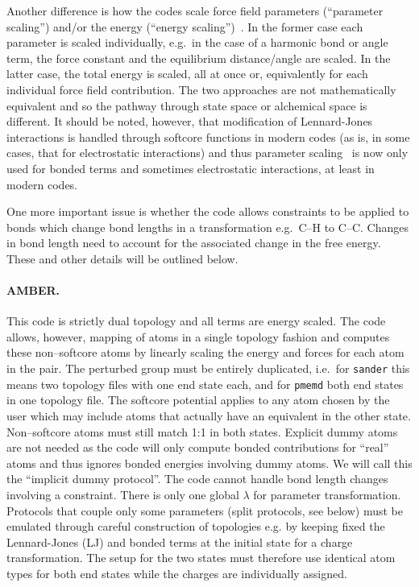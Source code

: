 \documentclass[journal=jctcce,manuscript=article]{achemso}
\newcommand{\progname}[1]{\texttt{#1}}
\begin{document}
Another difference is how the codes scale force field parameters (``parameter 
scaling'') and/or the energy (``energy 
scaling'')~\cite{doi:10.1021/jp981628n}.  In the former case each parameter is 
scaled individually, e.g.\ in the case of a harmonic bond or angle term,
the force constant and the equilibrium distance/angle are scaled. In the 
latter case, the total energy is scaled, all at once or, equivalently for each 
individual force field contribution.  The two approaches are not mathematically 
equivalent and so the pathway through state space or alchemical space 
is different.  It should be noted, however, that modification of Lennard-Jones 
interactions is handled through softcore functions in modern codes (as is, in 
some cases, that for electrostatic interactions) and thus parameter 
scaling~\cite{doi:10.1021/j100056a020, JCROSS1986198} is now only used for 
bonded terms and sometimes electrostatic interactions, at least in modern codes.

One more important issue is whether the code allows constraints to be applied 
to bonds which change bond lengths in a transformation e.g.\ C--H to C--C.  
Changes in bond length need to account for the associated change in the free 
energy.  These and other details will be outlined below.

\paragraph{AMBER.}
This code is strictly dual topology and all terms are energy scaled.  The code 
allows, however, mapping of atoms in a single topology fashion and computes 
these non--softcore atoms  by linearly scaling the energy and forces for each 
atom in the pair.  The perturbed group must be entirely duplicated, i.e.\ for 
\progname{sander} this means two topology files with one end state each, and 
for \progname{pmemd} both end states in one topology file.  The softcore 
potential applies to any atom chosen by the user which may include atoms that 
actually have an equivalent in the other state.  Non--softcore atoms must still 
match 1:1 in both states.  Explicit dummy atoms are not needed as the code will 
only compute bonded contributions for ``real'' atoms and thus ignores bonded 
energies involving dummy atoms.  We will call this the ``implicit dummy 
protocol''. The code cannot handle bond length changes involving a constraint.  
There is only one global $\lambda$ for parameter transformation.  Protocols 
that couple only some parameters (split protocols, see below) must be emulated 
through careful construction of topologies e.g. by keeping fixed the Lennard-Jones (LJ) and bonded terms at the initial state for a charge transformation.  The setup for 
the two states must therefore use identical atom types for both end states 
while the charges are individually assigned.
\end{document}
